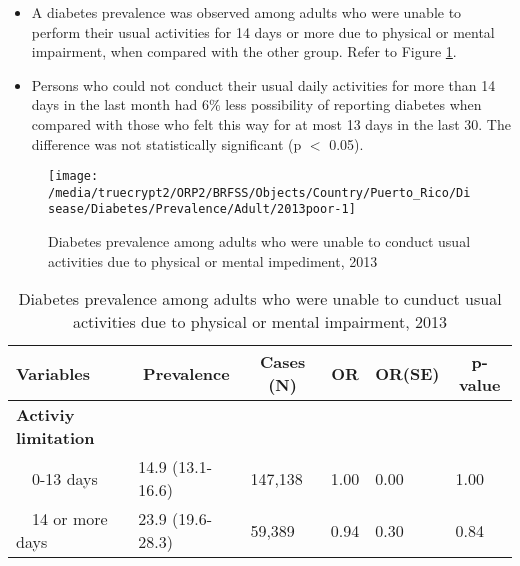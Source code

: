  \newpage
\begin{itemize}

\item A  
diabetes prevalence was observed among adults who were unable to perform their usual activities for 14 days or more due to physical or mental impairment, when compared with the other group. Refer to Figure \ref{fig:poor.Diabetes.2013}.



\item Persons who could not conduct their usual daily activities for more than 14 days in the last month had 6\% less possibility of reporting diabetes when compared with those who felt this way for at most 13 days in the last 30. The difference was not statistically significant (p $<$ 0.05).

\end{itemize}

\begin{figure}[H]
\caption{Diabetes prevalence among adults who were unable to conduct usual activities due to physical or mental impediment, 2013}
\label{fig:poor.Diabetes.2013}

\begin{knitrout}
\color{fgcolor}

{\centering \texttt{[image: /media/truecrypt2/ORP2/BRFSS/Objects/Country/Puerto\_Rico/Disease/Diabetes/Prevalence/Adult/2013poor-1]} 

}


\end{knitrout}
\end{figure}

\begin{table}[H]
\caption{Diabetes prevalence among adults who were unable to cunduct usual activities due to physical or mental impairment, 2013\label{tab:poor.Diabetes.2013}} 
\begin{center}
\begin{tabular}{llllll}
\hline\hline
\multicolumn{1}{l}{Variables}&\multicolumn{1}{c}{Prevalence}&\multicolumn{1}{c}{Cases (N)}&\multicolumn{1}{c}{OR}&\multicolumn{1}{c}{OR(SE)}&\multicolumn{1}{c}{p-value}\tabularnewline
\hline
{\bfseries Activiy limitation}&&&&&\tabularnewline
~~0-13 days&14.9 (13.1-16.6)&147,138&1.00&0.00&1.00\tabularnewline
~~14 or more days&23.9 (19.6-28.3)& 59,389&0.94&0.30&0.84\tabularnewline
\hline
\end{tabular}\end{center}

\end{table}


